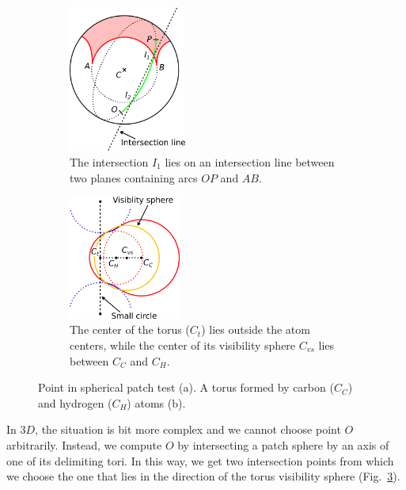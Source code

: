 \begin{figure}[htp]
  \centering
  \begin{subfigure}[c]{0.52\columnwidth}
    \centering
    \includegraphics[height=1.9in]{image/patch.png}
    \caption{%
		The intersection $I_1$ lies on an intersection line between two planes containing arcs $OP$ and $AB$.}
		\label{fig:spherical-patch}
  \end{subfigure}%
  \quad
  \begin{subfigure}[c]{0.44\columnwidth}
    \centering
    \includegraphics[height=1.6in]{image/outer.png}
    \caption{%
		The center of the torus ($C_{t}$) lies outside the atom centers, while the center of its visibility sphere $C_{vs}$ lies between $C_C$ and $C_H$.}
		\label{fig:outer-point}
  \end{subfigure}
\caption{Point in spherical patch test (a). A torus formed by carbon ($C_C$) and hydrogen ($C_H$) atoms (b).}
\end{figure}

In $3D$, the situation is bit more complex and we cannot choose point $O$ arbitrarily. 
Instead, we compute $O$ by intersecting a patch sphere by an axis of one of its delimiting tori.
In this way, we get two intersection points from which we choose the one that lies in the direction of the torus visibility sphere (Fig.~\ref{fig:outer-point}).

